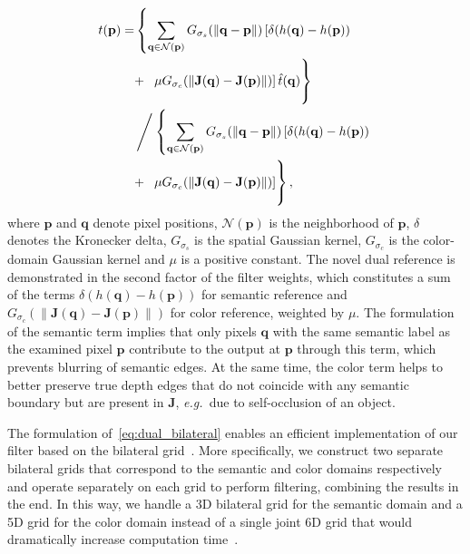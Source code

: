 \documentclass[twocolumn]{svjour3}          \smartqed  \usepackage{graphicx}
\newcommand{\eg}{\mbox{\emph{e.g.\ }}}
\newcommand{\vecnorm}[1]{\left\|#1\right\|}
\begin{document}
\begin{align}
{t}(\mathbf{p}) = &\left\{\displaystyle\sum_{\mathbf{q} \in \mathcal{N}(\mathbf{p})} G_{\sigma_s}(\vecnorm{\mathbf{q}-\mathbf{p}}) \left[\delta(h(\mathbf{q})-h(\mathbf{p}))\vphantom{\mu G_{\sigma_c}(\vecnorm{\mathbf{J}(\mathbf{q})-\mathbf{J}(\mathbf{p})})}\right.\vphantom{\hat{t}(\mathbf{q})}\right. \nonumber\\
&{+}\:\left.\vphantom{\displaystyle\sum_{q \in \mathcal{N}(\mathbf{p})} G_{\sigma_s}(\vecnorm{\mathbf{q}-\mathbf{p}})}\left.\vphantom{\delta(h(\mathbf{q})-h(\mathbf{p}))}\mu G_{\sigma_c}(\vecnorm{\mathbf{J}(\mathbf{q})-\mathbf{J}(\mathbf{p})})\right] \hat{t}(\mathbf{q})\right\} \nonumber\\
&\left/\:\middle\{\displaystyle\sum_{\mathbf{q} \in \mathcal{N}(\mathbf{p})} G_{\sigma_s}(\vecnorm{\mathbf{q}-\mathbf{p}}) \left[\delta(h(\mathbf{q})-h(\mathbf{p}))\vphantom{\mu G_{\sigma_c}(\vecnorm{\mathbf{J}(\mathbf{q})-\mathbf{J}(\mathbf{p})})}\right.\right. \nonumber\\
&{+}\:\left.\vphantom{\displaystyle\sum_{q \in \mathcal{N}(\mathbf{p})} G_{\sigma_s}(\vecnorm{\mathbf{q}-\mathbf{p}})}\left.\vphantom{\delta(h(\mathbf{q})-h(\mathbf{p}))}\mu G_{\sigma_c}(\vecnorm{\mathbf{J}(\mathbf{q})-\mathbf{J}(\mathbf{p})})\right]\right\},  \label{eq:dual_bilateral}
\end{align}
where $\mathbf{p}$ and $\mathbf{q}$ denote pixel positions, $\mathcal{N}(\mathbf{p})$ is the neighborhood of $\mathbf{p}$, $\delta$ denotes the Kronecker delta, $G_{\sigma_s}$ is the spatial Gaussian kernel, $G_{\sigma_c}$ is the color-domain Gaussian kernel and $\mu$ is a positive constant. The novel dual reference is demonstrated in the second factor of the filter weights, which constitutes a sum of the terms $\delta(h(\mathbf{q})-h(\mathbf{p}))$ for semantic reference and $G_{\sigma_c}(\vecnorm{\mathbf{J}(\mathbf{q})-\mathbf{J}(\mathbf{p})})$ for color reference, weighted by $\mu$. The formulation of the semantic term implies that only pixels $\mathbf{q}$ with the same semantic label as the examined pixel $\mathbf{p}$ contribute to the output at $\mathbf{p}$ through this term, which prevents blurring of semantic edges. At the same time, the color term helps to better preserve true depth edges that do not coincide with any semantic boundary but are present in $\mathbf{J}$, \eg{}due to self-occlusion of an object.

The formulation of~\eqref{eq:dual_bilateral} enables an efficient implementation of our filter based on the bilateral grid~\cite{bilateral:grid}. More specifically, we construct two separate bilateral grids that correspond to the semantic and color domains respectively and operate separately on each grid to perform filtering, combining the results in the end. In this way, we handle a 3D bilateral grid for the semantic domain and a 5D grid for the color domain instead of a single joint 6D grid that would dramatically increase computation time~\cite{bilateral:grid}.
\end{document}
